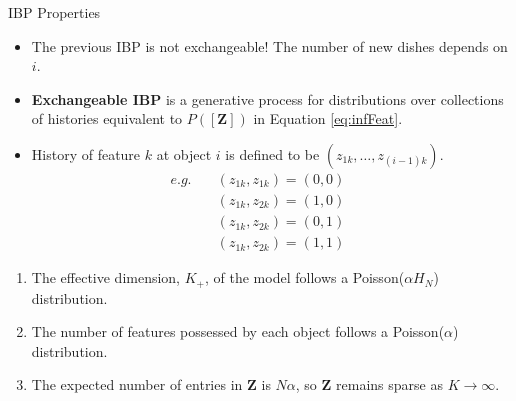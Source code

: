 \documentclass[aspectratio=169,xcolor=dvipsnames]{beamer}
\newcommand{\matz}{\textbf{Z}}
\begin{document}
\begin{frame}{IBP Properties}
\setlength{\leftmargini}{0.2cm}
\begin{itemize}
\item The previous IBP is not exchangeable! The number of new dishes depends on $i$. 
\item \textbf{Exchangeable IBP} is a generative process for distributions over collections of histories equivalent to $P([\matz])$ in Equation \ref{eq:infFeat}.
\item History of feature $k$ at object $i$ is defined to be $(z_{1k},\dots,z_{(i-1)k})$.
\begin{align*}
    e.g. \quad &(z_{1k}, z_{1k}) = (0, 0) \quad \quad\\
    &(z_{1k}, z_{2k}) = (1, 0)\\
    &(z_{1k}, z_{2k}) = (0, 1)\\
    &(z_{1k}, z_{2k}) = (1, 1)
\end{align*}
\end{itemize}
\setlength{\leftmargini}{0.4cm}
\begin{enumerate}
\item The effective dimension, $K_+$, of the model follows a Poisson($\alpha H_N$) distribution.
\item The number of features possessed by each object follows a Poisson($\alpha$)  distribution.
\item The expected number of entries in $\matz$ is $N\alpha$, so $\matz$ remains sparse as $K \rightarrow \infty$.
\end{enumerate}
\end{frame}
\end{document}
